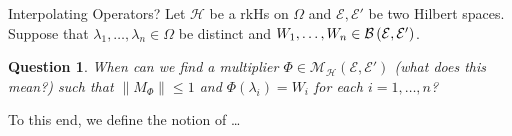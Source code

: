 \documentclass[handout]{beamer}
\newtheorem{question}[theorem]{Question}
\newcommand{\D}{\mathbb D}
\newcommand{\T}{\mathbb T}
\newcommand{\calE}{{\mathcal E}}
\newcommand{\calH}{{\mathcal H}}
\newcommand{\calM}{{\mathcal M}}
\newcommand{\norm}[1]{\left\lVert #1 \right\rVert}
\newcommand{\abs}[1]{\left\lvert #1 \right\rvert}
\begin{document}
\begin{frame}{Interpolating Operators?}
Let $\calH$ be a rkHs on $\Omega$ and $\calE , \calE'$ be two Hilbert spaces.
\pause
Suppose that $\lambda_{1}, \ldots, \lambda_{n} \in \Omega$ be distinct and $W_{1}, \ldots , W_{n} \in \cal{B} \left( \calE , \calE' \right)$. 
\pause
\begin{question}
When can we find a multiplier $\Phi \in \calM_{\calH} \left( \calE , \calE' \right)$ (\textit{what does this mean?}) such that $\norm{M_{\Phi}} \le 1$ and $\Phi \left( \lambda_{i} \right) = W_{i}$ for each $i=1, \ldots , n$?
\end{question}
\pause
To this end, we define the notion of \ldots

\end{frame}



\end{document}
